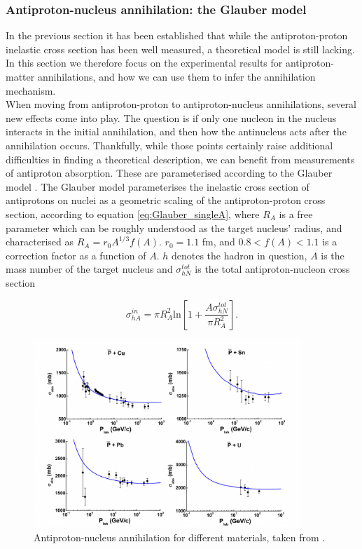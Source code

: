 \subsubsection{Antiproton-nucleus annihilation: the Glauber model}\label{sec:Intro:Glauber}
In the previous section it has been established that while the antiproton-proton inelastic cross section has been well measured, a theoretical model is still lacking. In this section we therefore focus on the experimental results for antiproton-matter annihilations, and how we can use them to infer the annihilation mechanism. \\

When moving from antiproton-proton to antiproton-nucleus annihilations, several new effects come into play. The question is if only one nucleon in the nucleus interacts in the initial annihilation, and then how the antinucleus acts after the annihilation occurs. Thankfully, while those points certainly raise additional difficulties in finding a theoretical description, we can benefit from measurements of antiproton absorption. These are parameterised according to the Glauber model \cite{Glauber_original, glauber_model_geant4_scaling, Antinucleus-nucleus_Geant4}. The Glauber model parameterises the inelastic cross section of antiprotons on nuclei as a geometric scaling of the antiproton-proton cross section, according to equation \ref{eq:Glauber_singleA}, where $R_A$ is a free parameter which can be roughly understood as the target nucleus' radius, and characterised as $R_A = r_0 A^{1/3}f(A)$. $r_0=1.1$ fm, and $0.8<f(A)<1.1$ is a correction factor as a function of $A$. $h$ denotes the hadron in question, $A$ is the mass number of the target nucleus and $\sigma_{hN}^{tot}$ is the total antiproton-nucleon cross section

\begin{equation}\label{eq:Glauber_singleA}
    \sigma_{hA}^{in} = \pi R_A^2 \mathrm{ln}\left[ 1+\frac{A\sigma_{hN}^{tot}}{\pi R_A^2}\right].
\end{equation}

\begin{figure}
    \centering
    \includegraphics[width=0.9\textwidth]{figures/pbar_annihilation_diff_materials.png}
    \caption{Antiproton-nucleus annihilation for different materials, taken from \cite{Antinucleus-nucleus_Geant4}.}
    \label{fig:pbar_diff_materials}
\end{figure}


